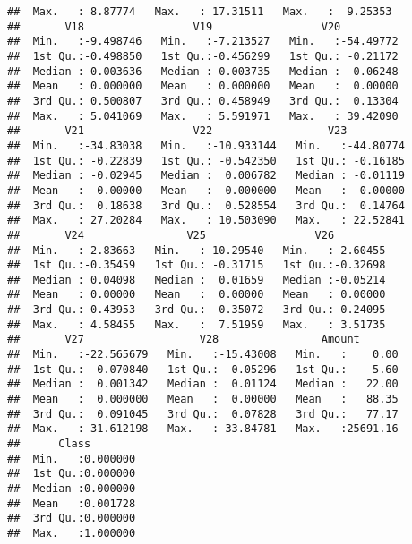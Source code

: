 \documentclass[]{article}
\newenvironment{Shaded}{\begin{snugshade}}{\end{snugshade}}
\newcommand{\StringTok}[1]{\textcolor[rgb]{0.31,0.60,0.02}{#1}}
\newcommand{\OperatorTok}[1]{\textcolor[rgb]{0.81,0.36,0.00}{\textbf{#1}}}
\newcommand{\NormalTok}[1]{#1}
\begin{document}
\begin{verbatim}
##  Max.   : 8.87774   Max.   : 17.31511   Max.   :  9.25353  
##       V18                 V19                 V20           
##  Min.   :-9.498746   Min.   :-7.213527   Min.   :-54.49772  
##  1st Qu.:-0.498850   1st Qu.:-0.456299   1st Qu.: -0.21172  
##  Median :-0.003636   Median : 0.003735   Median : -0.06248  
##  Mean   : 0.000000   Mean   : 0.000000   Mean   :  0.00000  
##  3rd Qu.: 0.500807   3rd Qu.: 0.458949   3rd Qu.:  0.13304  
##  Max.   : 5.041069   Max.   : 5.591971   Max.   : 39.42090  
##       V21                 V22                  V23           
##  Min.   :-34.83038   Min.   :-10.933144   Min.   :-44.80774  
##  1st Qu.: -0.22839   1st Qu.: -0.542350   1st Qu.: -0.16185  
##  Median : -0.02945   Median :  0.006782   Median : -0.01119  
##  Mean   :  0.00000   Mean   :  0.000000   Mean   :  0.00000  
##  3rd Qu.:  0.18638   3rd Qu.:  0.528554   3rd Qu.:  0.14764  
##  Max.   : 27.20284   Max.   : 10.503090   Max.   : 22.52841  
##       V24                V25                 V26          
##  Min.   :-2.83663   Min.   :-10.29540   Min.   :-2.60455  
##  1st Qu.:-0.35459   1st Qu.: -0.31715   1st Qu.:-0.32698  
##  Median : 0.04098   Median :  0.01659   Median :-0.05214  
##  Mean   : 0.00000   Mean   :  0.00000   Mean   : 0.00000  
##  3rd Qu.: 0.43953   3rd Qu.:  0.35072   3rd Qu.: 0.24095  
##  Max.   : 4.58455   Max.   :  7.51959   Max.   : 3.51735  
##       V27                  V28                Amount        
##  Min.   :-22.565679   Min.   :-15.43008   Min.   :    0.00  
##  1st Qu.: -0.070840   1st Qu.: -0.05296   1st Qu.:    5.60  
##  Median :  0.001342   Median :  0.01124   Median :   22.00  
##  Mean   :  0.000000   Mean   :  0.00000   Mean   :   88.35  
##  3rd Qu.:  0.091045   3rd Qu.:  0.07828   3rd Qu.:   77.17  
##  Max.   : 31.612198   Max.   : 33.84781   Max.   :25691.16  
##      Class         
##  Min.   :0.000000  
##  1st Qu.:0.000000  
##  Median :0.000000  
##  Mean   :0.001728  
##  3rd Qu.:0.000000  
##  Max.   :1.000000
\end{verbatim}

\begin{Shaded}
\end{Shaded}
\end{document}
